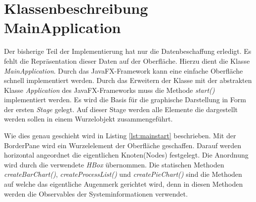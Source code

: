 \section{Klassenbeschreibung MainApplication}
Der bisherige Teil der Implementierung hat nur die Datenbeschaffung erledigt. Es fehlt die Repräsentation dieser Daten auf der Oberfläche. Hierzu dient die Klasse \textit{MainApplication}. Durch das JavaFX-Framework kann eine einfache Oberfläche schnell implementiert werden. Durch das Erweitern der Klasse mit der abstrakten Klasse \textit{Application} des JavaFX-Frameworks muss die Methode \textit{start()} implementiert werden. Es wird die Basis für die graphische Darstellung in Form der ersten \textit{Stage} gelegt. Auf dieser Stage werden alle Elemente die dargestellt werden sollen in einem Wurzelobjekt zusammengeführt. 
 
Wie dies genau geschieht wird in Listing \ref{lst:mainstart} beschrieben. Mit der BorderPane wird ein Wurzelelement der Oberfläche geschaffen. Darauf werden horizontal angeordnet die eigentlichen Knoten(Nodes) festgelegt. Die Anordnung wird durch die verwendete \textit{HBox} übernommen. Die statischen Methoden \textit{createBarChart()}, \textit{createProcessList()} und \textit{createPieChart()} sind die Methoden auf welche das eigentliche Augenmerk gerichtet wird, denn in diesen Methoden werden die Observables der Systeminformationen verwendet. 
